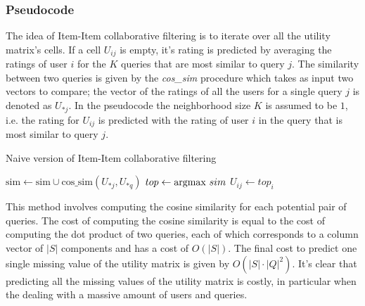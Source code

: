 \subsubsection{Pseudocode} The idea of Item-Item collaborative filtering is to iterate over all the utility matrix's cells. If a cell $U_{ij}$ is empty, it's rating is predicted by averaging the ratings of user $i$ for the $K$ queries that are most similar to query $j$. The similarity between two queries is given by the \emph{cos\_sim} procedure which takes as input two vectors to compare; the vector of the ratings of all the users for a single query $j$ is denoted as $U_{*j}$. In the pseudocode the neighborhood size $K$ is assumed to be $1$, i.e. the rating for $U_{ij}$ is predicted with the rating of user $i$ in the query that is most similar to query $j$.

\begin{algorithm}[h]
	\caption{Naive version of Item-Item collaborative filtering} 
	\begin{algorithmic}[1]
	             
        	            \State $\text{sim} \gets \text{sim} \cup \text{cos\_sim}(U_{*j}, U_{*q})$
                    \EndFor
                    \State $top \gets \operatorname*{argmax} \,sim$ 
                    \State $U_{ij} \gets top_i$
	            \EndIf
            \EndFor
        \EndFor
	\end{algorithmic} 
\end{algorithm}

This method involves computing the cosine similarity for each potential pair of queries. The cost of computing the cosine similarity is equal to the cost of computing the dot product of two queries, each of which corresponds to a column vector of $|S|$ components and has a cost of $O(|S|)$. The final cost to predict one single missing value of the utility matrix is given by $O(|S|\cdot|Q|^2)$. It's clear that predicting all the missing values of the utility matrix is costly, in particular when the dealing with a massive amount of users and queries.

